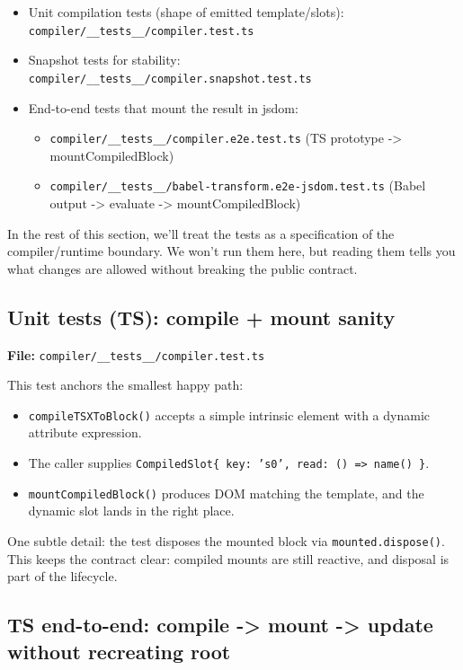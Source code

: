 \begin{itemize}
\item Unit compilation tests (shape of emitted template/slots): \texttt{compiler/\_\_tests\_\_/compiler.test.ts}
\item Snapshot tests for stability: \texttt{compiler/\_\_tests\_\_/compiler.snapshot.test.ts}
\item End-to-end tests that mount the result in jsdom:
  \begin{itemize}
  \item \texttt{compiler/\_\_tests\_\_/compiler.e2e.test.ts} (TS prototype -> mountCompiledBlock)
  \item \texttt{compiler/\_\_tests\_\_/babel-transform.e2e-jsdom.test.ts} (Babel output -> evaluate -> mountCompiledBlock)
  \end{itemize}
\end{itemize}

In the rest of this section, we'll treat the tests as a specification of the compiler/runtime boundary.
We won't run them here, but reading them tells you what changes are allowed without breaking the public contract.

\subsection{Unit tests (TS): compile + mount sanity}


	\textbf{File:} \texttt{compiler/\_\_tests\_\_/compiler.test.ts}

This test anchors the smallest happy path:

\begin{itemize}
\item \texttt{compileTSXToBlock()} accepts a simple intrinsic element with a dynamic attribute expression.
\item The caller supplies \texttt{CompiledSlot\{ key: 's0', read: () => name() \}}.
\item \texttt{mountCompiledBlock()} produces DOM matching the template, and the dynamic slot lands in the right place.
\end{itemize}

One subtle detail: the test disposes the mounted block via \texttt{mounted.dispose()}. This keeps the contract clear: compiled mounts are still reactive, and disposal is part of the lifecycle.

\subsection{TS end-to-end: compile -> mount -> update without recreating root}

